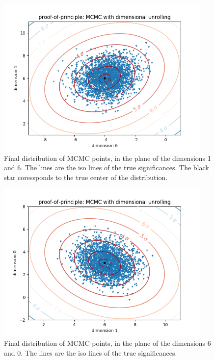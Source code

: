 \documentclass[11pt,singleside,a4paper,makeidx,notitlepage]{article}
\begin{document}
\begin{figure}[h!t]
\begin{center}
\includegraphics[width=300pt]{xy.png}
\caption{Final distribution of MCMC points, in the plane of the dimensions 1
and 6. The lines are the iso lines of the true significances. The black star
coressponds to the true center of the distribution. }
\label{fig_xy}
\end{center}
\end{figure}

\begin{figure}[h!t]
\begin{center}
\includegraphics[width=300pt]{yz.png}
\caption{Final distribution of MCMC points, in the plane of the dimensions 6
and 0. The lines are the iso lines of the true significances.}
\label{fig_yz}
\end{center}
\end{figure}
\end{document}
